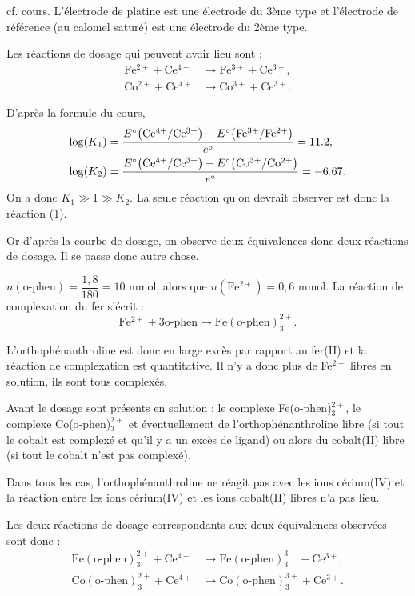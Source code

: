 \begin{solution}
\begin{questions}
\questioncours cf. cours. L'électrode de platine est une électrode du 3ème type et l'électrode de référence (au calomel saturé) est une électrode du 2ème type.

\question 
Les réactions de dosage qui peuvent avoir lieu sont :
\begin{align}
    \mathrm{Fe^{2+} + Ce^{4+}} &\longrightarrow \mathrm{Fe^{3+} + Ce^{3+}}, \tag{1} \\
    \mathrm{Co^{2+} + Ce^{4+}} &\longrightarrow \mathrm{Co^{3+} + Ce^{3+}}. \tag{2}
\end{align}

D'après la formule du cours,
\begin{align*}
    \log(K_1) &= \dfrac{E^\circ\qty\big(\mathrm{Ce^{4+} / Ce^{3+}}) - E^\circ\qty\big(\mathrm{Fe^{3+} / Fe^{2+}})}{e^\circ} = 11.2, \\
    \log(K_2) &= \dfrac{E^\circ\qty\big(\mathrm{Ce^{4+} / Ce^{3+}}) - E^\circ\qty\big(\mathrm{Co^{3+} / Co^{2+}})}{e^\circ} = -6.67.
\end{align*}
On a donc $K_1 \gg 1 \gg K_2$. La seule réaction qu'on devrait observer est donc la réaction (1). 

Or d'après la courbe de dosage, on observe deux équivalences donc deux réactions de dosage. Il se passe donc autre chose.

\question $n(\text{o-phen}) = \dfrac{1,8}{180} = 10$ mmol, alors que  $n(\mathrm{Fe^{2+}}) = 0,6$ mmol. La réaction de complexation du fer s'écrit :
$$\mathrm{Fe^{2+} + 3 \text{o-phen} \longrightarrow Fe(\text{o-phen})_3^{2+}.}$$

L'orthophénanthroline est donc en large excès par rapport au fer(II) et la réaction de complexation est quantitative. 
Il n'y a donc plus de Fe$^{2+}$ libres en solution, ils sont tous complexés.  

\question Avant le dosage sont présents en solution : le complexe Fe(o-phen)$_3^{2+}$, le complexe Co(o-phen)$_3^{2+}$ et éventuellement de l'orthophénanthroline libre (si tout le cobalt est complexé et qu'il y a un excès de ligand) ou alors du cobalt(II) libre (si tout le cobalt n'est pas complexé). 

Dans tous les cas, l'orthophénanthroline ne réagit pas avec les ions cérium(IV) et la réaction entre les ions cérium(IV) et les ions cobalt(II) libres n'a pas lieu. 

Les deux réactions de dosage correspondants aux deux équivalences observées sont donc :
\begin{align}
    \mathrm{Fe(\text{o-phen})_3^{2+} + Ce^{4+}} &\longrightarrow \mathrm{Fe(\text{o-phen})_3^{3+} + Ce^{3+}}, \tag{3} \\
    \mathrm{Co(\text{o-phen})_3^{2+} + Ce^{4+}} &\longrightarrow \mathrm{Co(\text{o-phen})_3^{3+} + Ce^{3+}}. \tag{4}
\end{align}


\end{questions}
\end{solution}
